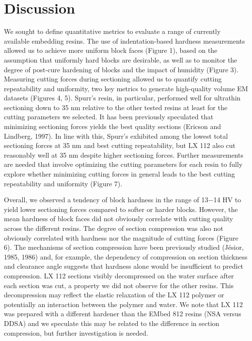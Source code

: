 \documentclass{article}
\begin{document}
\section*{Discussion}

We sought to define quantitative metrics to evaluate a range of currently available embedding resins. The use of indentation-based hardness measurements allowed us to achieve more uniform block faces (Figure 1), based on the assumption that uniformly hard blocks are desirable, as well as to monitor the degree of post-cure hardening of blocks and the impact of humidity (Figure 3). Measuring cutting forces during sectioning allowed us to quantify cutting repeatability and uniformity, two key metrics to generate high-quality volume EM datasets (Figures 4, 5). Spurr’s resin, in particular, performed well for ultrathin sectioning down to 35 nm relative to the other tested resins at least for the cutting parameters we selected. It has been previously speculated that minimizing sectioning forces yields the best quality sections (Ericson and Lindberg, 1997). In line with this, Spurr’s exhibited among the lowest total sectioning forces at 35 nm and best cutting repeatability, but LX 112 also cut reasonably well at 35 nm despite higher sectioning forces. Further measurements are needed that involve optimizing the cutting parameters for each resin to fully explore whether minimizing cutting forces in general leads to the best cutting repeatability and uniformity (Figure 7).

Overall, we observed a tendency of block hardness in the range of 13−14 HV to yield lower sectioning forces compared to softer or harder blocks. However, the mean hardness of block faces did not obviously correlate with cutting quality across the different resins. The degree of section compression was also not obviously correlated with hardness nor the magnitude of cutting forces (Figure 6). The mechanisms of section compression have been previously studied (Jésior, 1985, 1986) and, for example, the dependency of compression on section thickness and clearance angle suggests that hardness alone would be insufficient to predict compression. LX 112 sections visibly decompressed on the water surface after each section was cut, a property we did not observe for the other resins. This decompression may reflect the elastic relaxation of the LX 112 polymer or potentially an interaction between the polymer and water. We note that LX 112 was prepared with a different hardener than the EMbed 812 resins (NSA versus DDSA) and we speculate this may be related to the difference in section compression, but further investigation is needed.
\end{document}
